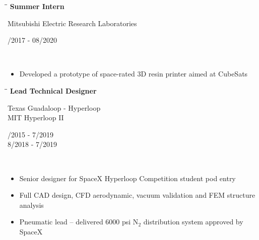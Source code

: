 \documentclass[11pt]{res}
\newcommand{\comment}[1]{}
\begin{document}
\begin{resume}
    \vspace{-18pt}
   \begin{tabbing}
   \hspace{2.3in}\= \hspace{2.7in}\= \kill %
    {\bf Summer Intern} \> \parbox[c]{7.5cm}{ \centering Mitsubishi Electric Research Laboratories}    \> \parbox[c]{3.8cm}{ /2017 - 08/2020} \\
   \end{tabbing}
   \vspace{-18pt}      %
    \begin{itemize}
   	\setlength{\leftmargin}{-15pt} \setlength\itemsep{0pt}
   	\item Developed a prototype of space-rated 3D resin printer aimed at CubeSats
   	\end{itemize}
	
  \vspace{-18pt}
   \begin{tabbing}
   \hspace{2.3in}\= \hspace{2.7in}\= \kill %
    {\bf Lead Technical Designer} \> \parbox[c]{7.5cm}{ \centering Texas Guadaloop - Hyperloop \\ MIT Hyperloop II} \> \parbox[c]{3.8cm}{ /2015 - 7/2019 \\ 8/2018 - 7/2019}\\
   \end{tabbing}
   \vspace{-18pt}
   	\begin{itemize}
   	\setlength{\leftmargin}{-15pt} \setlength\itemsep{0pt}
	 \item Senior designer for SpaceX Hyperloop Competition student pod entry
	 \item Full CAD design, CFD aerodynamic, vacuum validation and FEM structure analysis
	 \item Pneumatic lead {}-- delivered 6000 psi N$_2$ distribution system approved by SpaceX
	\end{itemize} 

 
\comment{
   \begin{tabbing}
   \hspace{2.7in}\= \hspace{2.3in}\= \kill %
    {\bf Visiting Research Assistant} \> \parbox[c]{6cm}{ \centering The University of Edinburgh}    \> \parbox[c]{3.8cm}{ \raggedleft 06/2013 - 12/2013} \\
   \end{tabbing}\vspace{-30pt}      %
	Continuation of Master's Thesis work, which included CAD, thermal modeling and FEM simulations. Provided insight into cryoengineering, applications of superconductors, thermal management and CAE under the supervision by Dr. Markus Mueller.
 \vspace{-9pt}

}
\end{resume}
\end{document}

